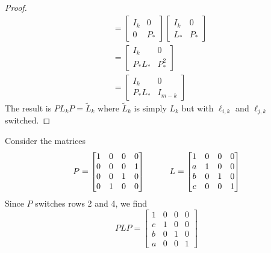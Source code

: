 \begin{proposition}
\begin{proof}
\begin{align*}
&=
\left[ \begin{array}{c|c} I_k & 0 \\ \hline 0 & P_* \end{array} \right]
\left[ \begin{array}{c|c} I_k & 0 \\ \hline L_* & P_* \end{array} \right] \\
&=
\left[ \begin{array}{c|c} I_k & 0 \\ \hline P_*L_* & P_*^2 \end{array} \right] \\
&=
\left[ \begin{array}{c|c} I_k & 0 \\ \hline P_*L_* & I_{m-k} \end{array} \right]
\end{align*}
The result is $P L_k P = \tilde{L}_k$ where $\tilde{L}_k$ is simply $L_k$ but with $\ell_{i,k}$ and $\ell_{j,k}$ switched.
\end{proof}
\end{proposition}

\begin{example}
Consider the matrices
$$
P =
\begin{bmatrix}
1 & 0 & 0 & 0 \\
0 & 0 & 0 & 1 \\
0 & 0 & 1 & 0 \\
0 & 1 & 0 & 0
\end{bmatrix}
\hspace{10mm}
L =
\begin{bmatrix}
1 & 0 & 0 & 0 \\
a & 1 & 0 & 0 \\
b & 0 & 1 & 0 \\
c & 0 & 0 & 1
\end{bmatrix}
$$
Since $P$ switches rows 2 and 4, we find
$$
P L P = \begin{bmatrix}
1 & 0 & 0 & 0 \\
c & 1 & 0 & 0 \\
b & 0 & 1 & 0 \\
a & 0 & 0 & 1
\end{bmatrix}
$$
\end{example}

